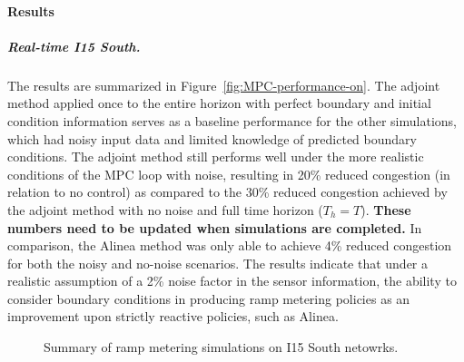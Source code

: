 								\paragraph{Results}
																
																
								\subparagraph{Real-time I15 South.}
																
								The results are summarized in Figure~\ref{fig:MPC-performance-on}.
								The adjoint method applied once to the entire horizon with perfect
								boundary and initial condition information serves as a baseline performance
								for the other simulations, which had noisy input data and limited
								knowledge of predicted boundary conditions. The adjoint method still
								performs well under the more realistic conditions of the MPC loop
								with noise, resulting in 20\% reduced congestion (in relation to no control) as compared to the 30\% reduced congestion achieved by the adjoint method with no noise and full time horizon ($T_h=T$). \textbf{These numbers need to be updated when simulations are completed.} In comparison, the Alinea method was only able to achieve 4\% reduced congestion for both the noisy and no-noise scenarios. The results indicate
								that under a realistic assumption of a 2\% noise factor in the sensor
								information, the ability to consider boundary conditions in producing
								ramp metering policies as an improvement upon strictly reactive policies,
								such as Alinea.
																
								\begin{figure}
									\hfill{}
									\caption{Summary of ramp metering simulations on I15 South netowrks.}
								\end{figure}
																
